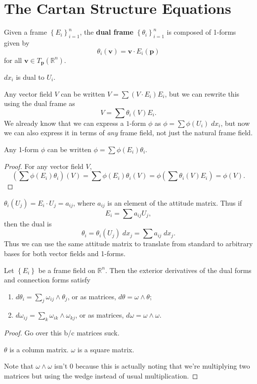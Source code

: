 \documentclass[10pt]{report}
\begin{document}
\section{The Cartan Structure Equations}

\begin{defn}[]
Given a frame $\left\{ E_i \right\}_{i=1}^n$, the \textbf{dual frame} $\left\{ \theta_{i} \right\}_{i=1}^n$ is composed of 1-forms given by
\[
	\theta_i(\mathbf{v}) = \mathbf{v} \cdot E_i(\mathbf{p})
\] for all $\mathbf{v} \in T_{\mathbf{p}}(\mathbb{R}^n)$.
\end{defn}

\begin{ex}[]
$dx_i$ is dual to $U_i$.
\end{ex}

Any vector field $V$ can be written $V=\sum (V \cdot E_i)E_i$, but we can rewrite this using the dual frame as
\[
	V = \sum \theta_i(V) E_i.
\] 
We already know that we can express a $1$-form $\phi$ as $\phi=\sum \phi(U_i)\;dx_i$, but now we can also express it in terms of \textit{any} frame field, not just the natural frame field.

\begin{lem}
	Any 1-form $\phi$ can be written $\phi=\sum \phi(E_i)\theta_i$.
\end{lem}
\begin{proof}
	For any vector field $V$,
	\[
		\left( \sum \phi(E_i)\theta_i \right)(V) = \sum\phi(E_i)\theta_i(V) = \phi\left( \sum \theta_i(V) E_i \right)=\phi(V).
	\] 
\end{proof}

\begin{ex}[]
	$\theta_i(U_j) = E_i \cdot U_j=a_{ij}$, where $a_{ij}$ is an element of the attitude matrix. Thus if
	\[
	E_i = \sum a_{ij}U_j,
	\] then the dual is
	\[
		\theta_i = \theta_i(U_j) \;dx_j=\sum a_{ij}\;dx_j.
	\] Thus we can use the same attitude matrix to translate from standard to arbitrary bases for both vector fields and 1-forms.
\end{ex}

\begin{thrm}
	Let $\left\{ E_i \right\}$ be a frame field on $\mathbb{R}^n$. Then the exterior derivatives of the dual forms and connection forms satisfy
\begin{enumerate}
	\item $d\theta_i = \sum_j \omega_{ij}\wedge \theta_j$, or as matrices, $d\theta=\omega\wedge\theta$;
	\item $d\omega_{ij}=\sum_k \omega_{ik}\wedge\omega_{kj}$, or as matrices, $d\omega=\omega\wedge\omega$.
\end{enumerate}
\end{thrm}
\begin{proof}
	{\color{red}Go over this b/c matrices suck.}

	{\color{red}$\theta$ is a column matrix. $\omega$ is a square matrix.}

	{\color{red}Note that $\omega\wedge\omega$ isn't 0 because this is actually noting that we're multiplying two matrices but using the wedge instead of usual multiplication.}
\end{proof}
\end{document}
